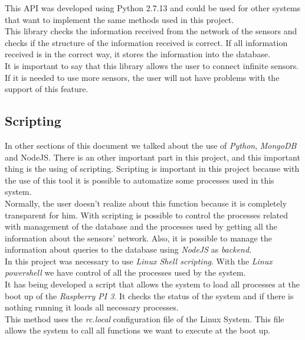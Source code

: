 This API was developed using Python 2.7.13 and could be used for other systems that want to implement the same methods used in this project.\\

This library checks the information received from the network of the sensors and checks if the structure of the information received is correct. If all information received is in the correct way, it stores the information into the database.\\

It is important to say that this library allows the user to connect infinite sensors. If it is needed to use more sensors, the user will not have problems with the support of this feature.

\subsection{Scripting}

In other sections of this document we talked about the use of \textit{Python}, \textit{MongoDB} and NodeJS. There is an other important part in this project, and this important thing is the using of scripting. Scripting is important in this project because with the use of this tool it is possible to automatize some processes used in this system.\\

Normally, the user doesn't realize about this function because it is completely transparent for him. With scripting is possible to control the processes related with management of the database and the processes used by getting all the information about the sensors' network. Also, it is possible to manage the information about queries to the database using \textit{NodeJS} as \textit{backend}.\\

In this project was necessary to use \textit{Linux Shell scripting}. With the \textit{Linux powershell} we have control of all the processes used by the system.\\

It has being developed a script that allows the system to load all processes at the boot up of the \textit{Raspberry PI 3}. It checks the status of the system and if there is nothing running it loads all necessary processes.\\

This method uses the \textit{rc.local} configuration file of the Linux System. This file allows the system to call all functions we want to execute at the boot up.

